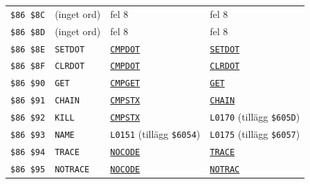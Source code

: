 \begin{small}
\begin{longtable}{@{}l l l l@{}}
\texttt{\$86 \$8C} & (inget ord) & fel 8 & fel 8\\
\texttt{\$86 \$8D} & (inget ord) & fel 8 & fel 8\\
\texttt{\$86 \$8E} & \texttt{SETDOT} & \hyperlink{l:CMPDOT}{\texttt{CMPDOT}} & \hyperlink{l:SETDOT}{\texttt{SETDOT}}\\
\texttt{\$86 \$8F} & \texttt{CLRDOT} & \hyperlink{l:CMPDOT}{\texttt{CMPDOT}} & \hyperlink{l:CLRDOT}{\texttt{CLRDOT}}\\
\texttt{\$86 \$90} & \texttt{GET} & \hyperlink{l:CMPGET}{\texttt{CMPGET}} & \hyperlink{l:GET}{\texttt{GET}}\\
\texttt{\$86 \$91} & \texttt{CHAIN} & \hyperlink{l:CMPSTX}{\texttt{CMPSTX}} & \hyperlink{l:CHAIN}{\texttt{CHAIN}}\\
\texttt{\$86 \$92} & \texttt{KILL} & \hyperlink{l:CMPSTX}{\texttt{CMPSTX}} & \texttt{L0170} {\footnotesize(tillägg \texttt{\$605D})}\\
\texttt{\$86 \$93} & \texttt{NAME} & \texttt{L0151} {\footnotesize(tillägg \texttt{\$6054})} & \texttt{L0175} {\footnotesize(tillägg \texttt{\$6057})}\\
\texttt{\$86 \$94} & \texttt{TRACE} & \hyperlink{l:NOCODE}{\texttt{NOCODE}} & \hyperlink{l:TRACE}{\texttt{TRACE}}\\
\texttt{\$86 \$95} & \texttt{NOTRACE} & \hyperlink{l:NOCODE}{\texttt{NOCODE}} & \hyperlink{l:NOTRAC}{\texttt{NOTRAC}}\\
\end{longtable}\end{small}
